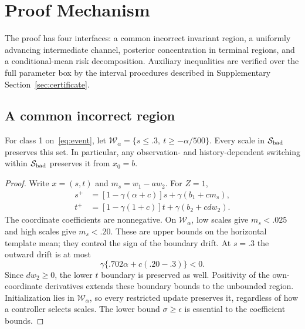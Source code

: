 \section{Proof Mechanism}
The proof has four interfaces: a common incorrect invariant region, a uniformly advancing intermediate channel, posterior concentration in terminal regions, and a conditional-mean risk decomposition. Auxiliary inequalities are verified over the full parameter box by the interval procedures described in Supplementary Section~\ref{sec:certificate}.

\subsection{A common incorrect region}
\begin{lemma}\label{lem:barrier}
For class 1 on~\eqref{eq:event}, let $\mathcal W_\alpha=\{s\le.3,\ t\ge-\alpha/500\}$. Every scale in $\mathcal S_{\mathrm{bad}}$ preserves this set. In particular, any observation- and history-dependent switching within $\mathcal S_{\mathrm{bad}}$ preserves it from $x_0=b$.
\end{lemma}
\begin{proof}
Write $x=(s,t)$ and $m_s=w_1-aw_2$. For $Z=1$,
\begin{align}
s^+&=[1-\gamma(\alpha+c)]s+\gamma(b_1+cm_s),\\
t^+&=[1-\gamma(1+c)]t+\gamma(b_2+cdw_2).
\end{align}
The coordinate coefficients are nonnegative. On
$\mathcal W_\alpha$, low scales give $m_s<.025$ and high scales give $m_s<.20$. These are upper bounds on the horizontal template mean; they control the sign of the boundary drift. At $s=.3$ the outward drift is at most
\begin{equation}
\gamma\{.702\alpha+c(.20-.3)\}<0.
\end{equation}
Since $dw_2\ge0$, the lower $t$ boundary is preserved as well. Positivity of the own-coordinate derivatives extends these boundary bounds to the unbounded region. Initialization lies in $\mathcal W_\alpha$, so every restricted update preserves it, regardless of how a controller selects scales. The lower bound $\sigma\ge\epsilon$ is essential to the coefficient bounds.
\end{proof}

